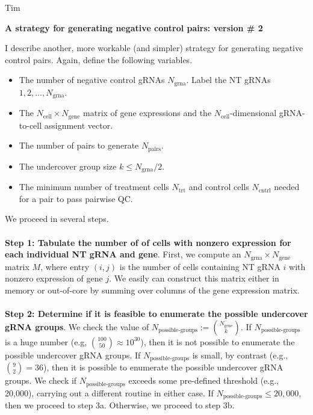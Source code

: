 \documentclass[12pt]{article}
\begin{document}
\noindent
Tim

\begin{center}
\textbf{A strategy for generating negative control pairs: version \# 2}
\end{center}

I describe another, more workable (and simpler) strategy for generating negative control pairs. Again, define the following variables.

\begin{itemize}
	\item The number of negative control gRNAs $N_\textrm{grna}$. Label the NT gRNAs $1, 2, \dots, N_\textrm{grna}$.
	\item The $N_\textrm{cell} \times N_\textrm{gene}$ matrix of gene expressions and the $N_\textrm{cell}$-dimensional gRNA-to-cell assignment vector.
	\item The number of pairs to generate $N_\textrm{pairs}$.
	\item The undercover group size $k \leq N_\textrm{grna}/2$.
	\item The minimum number of treatment cells $N_\textrm{trt}$ and control cells $N_\textrm{cntrl}$ needed for a pair to pass pairwise QC.
\end{itemize}
We proceed in several steps.
\\ \\
\textbf{Step 1: Tabulate the number of of cells with nonzero expression for each individual NT gRNA and gene}. First, we compute an $N_\textrm{grna} \times N_\textrm{gene}$ matrix $M$, where entry $(i,j)$ is the number of cells containing NT gRNA $i$ with nonzero expression of gene $j$. We easily can construct this matrix either in memory or out-of-core by summing over columns of the gene expression matrix.
\\ \\
\textbf{Step 2: Determine if it is feasible to enumerate the possible undercover gRNA groups}. We check the value of $N_\textrm{possible-groups} := \binom{N_\textrm{gene}}{k}$. If $N_\textrm{possible-groups}$ is a huge number (e.g, $ \binom{100}{50} \approx 10^{30}$), then it is not possible to enumerate the possible undercover gRNA groups. If $N_\textrm{possible-groups}$ is small, by contrast (e.g., $\binom{9}{2} = 36$), then it is possible to enumerate the possible undercover gRNA groups. We check if $N_\textrm{possible-groups}$ exceeds some pre-defined threshold (e.g., 20,000), carrying out a different routine in either case. If $N_\textrm{possible-groups} \leq 20,000$, then we proceed to step 3a. Otherwise, we proceed to step 3b. 
\end{document}
